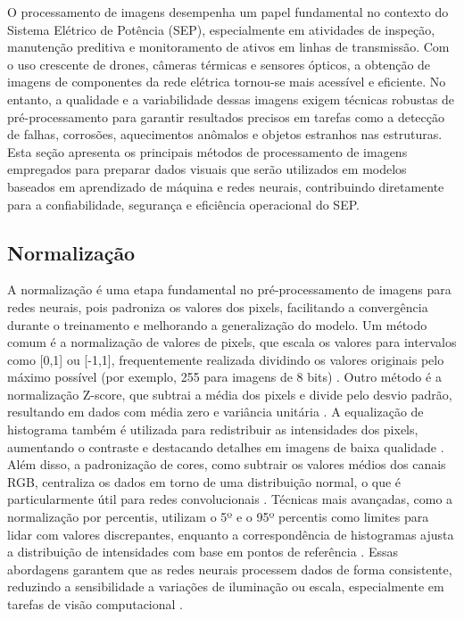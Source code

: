 O processamento de imagens desempenha um papel fundamental no contexto do Sistema Elétrico de Potência (SEP), especialmente em atividades de inspeção, manutenção preditiva e monitoramento de ativos em linhas de transmissão. Com o uso crescente de drones, câmeras térmicas e sensores ópticos, a obtenção de imagens de componentes da rede elétrica tornou-se mais acessível e eficiente. No entanto, a qualidade e a variabilidade dessas imagens exigem técnicas robustas de pré-processamento para garantir resultados precisos em tarefas como a detecção de falhas, corrosões, aquecimentos anômalos e objetos estranhos nas estruturas. Esta seção apresenta os principais métodos de processamento de imagens empregados para preparar dados visuais que serão utilizados em modelos baseados em aprendizado de máquina e redes neurais, contribuindo diretamente para a confiabilidade, segurança e eficiência operacional do SEP.

\subsection{Normalização}
A normalização é uma etapa fundamental no pré-processamento de imagens para redes neurais, pois padroniza os valores dos pixels, facilitando a convergência durante o treinamento e melhorando a generalização do modelo. Um método comum é a normalização de valores de pixels, que escala os valores para intervalos como [0,1] ou [-1,1], frequentemente realizada dividindo os valores originais pelo máximo possível (por exemplo, 255 para imagens de 8 bits) \cite{sharma2024deep}. Outro método é a normalização Z-score, que subtrai a média dos pixels e divide pelo desvio padrão, resultando em dados com média zero e variância unitária \cite{chen2023robustness}. A equalização de histograma também é utilizada para redistribuir as intensidades dos pixels, aumentando o contraste e destacando detalhes em imagens de baixa qualidade \cite{chen2023robustness}. Além disso, a padronização de cores, como subtrair os valores médios dos canais RGB, centraliza os dados em torno de uma distribuição normal, o que é particularmente útil para redes convolucionais \cite{sciencedirect2023normalization}. Técnicas mais avançadas, como a normalização por percentis, utilizam o 5º e o 95º percentis como limites para lidar com valores discrepantes, enquanto a correspondência de histogramas ajusta a distribuição de intensidades com base em pontos de referência \cite{isola2023comparison}. Essas abordagens garantem que as redes neurais processem dados de forma consistente, reduzindo a sensibilidade a variações de iluminação ou escala, especialmente em tarefas de visão computacional \cite{sharma2024deep}.

